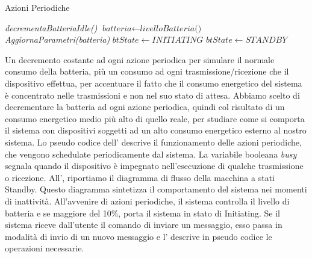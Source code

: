 \begin{algorithm}[t]
	\caption{Azioni Periodiche}\label{alg:periodic_actions}
	\begin{algorithmic}[1]
		\State \textit{decrementaBatteriaIdle()}
		\State $ \textit{batteria} \gets \textit{livelloBatteria() } $
		\State \textit{AggiornaParametri(\textit{batteria})}
		\State $ \textit{btState} \gets INITIATING $
		\EndIf
		\Else
		\State $ \textit{btState} \gets STANDBY $
		\EndIf
		\EndFunction
	\end{algorithmic}
\end{algorithm}
Un decremento costante ad ogni azione periodica per simulare il normale consumo della batteria, più un consumo ad ogni trasmissione/ricezione che il dispositivo effettua, per accentuare il fatto che il consumo energetico del sistema è concentrato nelle trasmissioni e non nel suo stato di attesa. Abbiamo scelto di decrementare la batteria ad ogni azione periodica, quindi col risultato di un consumo energetico medio più alto di quello reale, per studiare come si comporta il sistema con dispositivi soggetti ad un alto consumo energetico esterno al nostro sistema. Lo pseudo codice dell' descrive il funzionamento delle azioni periodiche, che vengono schedulate periodicamente dal sistema. La variabile booleana \textit{busy} segnala quando il dispositivo è impegnato nell'esecuzione di qualche trasmissione o ricezione. All', riportiamo il diagramma di flusso della macchina a stati Standby. Questo diagramma sintetizza il comportamento del sistema nei momenti di inattività. All'avvenire di azioni periodiche, il sistema controlla il livello di batteria e se maggiore del 10\%, porta il sistema in stato di Initiating. Se il sistema riceve dall'utente il comando di inviare un messaggio, esso passa in modalità di invio di un nuovo messaggio e l' descrive in pseudo codice le operazioni necessarie.

